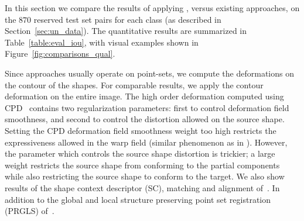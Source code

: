 \documentclass[acmtog,timestamp]{acmart}%
\begin{document}
In this section we compare the results of applying \ourmethod{}, versus existing approaches, on the $870$%
reserved test set pairs for each class (as described in Section~\ref{sec:un_data}). The quantitative results are summarized in Table~\ref{table:eval_iou}, with visual examples shown in Figure~\ref{fig:comparisons_qual}.

Since  approaches usually operate on point-sets, we compute the deformations on the contour of the shapes. For comparable results, we apply the contour deformation on the entire image. The high order deformation computed using CPD~\cite{CPD} contains two regularization parameters: first to control deformation field smoothness, and second to control the distortion allowed on the source shape. Setting the CPD deformation field smoothness weight too high restricts the expressiveness allowed in the warp field (similar phenomenon as in \ourmethod{}). However, the parameter which controls the source shape distortion is trickier; a large weight restricts the source shape from conforming to the partial components while also restricting the source shape to conform to the target. We also show results of the shape context descriptor (SC), matching and alignment of~\cite{Belongie2002}. In addition to the global and local structure preserving point set registration (PRGLS) of~\cite{ma2016non}.
\end{document}
